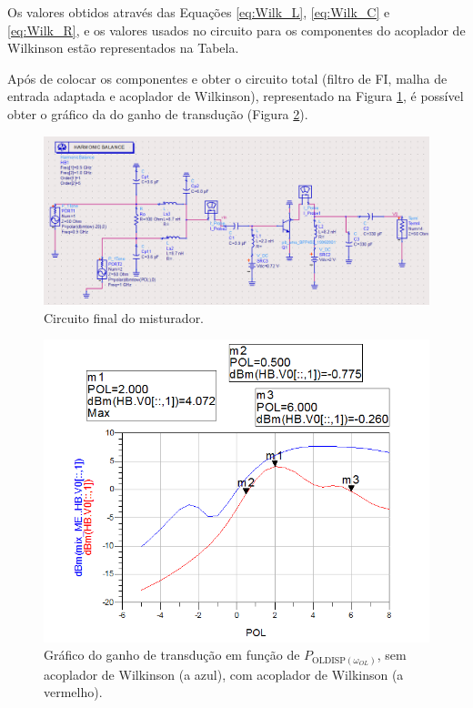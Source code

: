 \documentclass[11pt]{article}
\numberwithin{equation}{section}
\begin{document}
Os valores obtidos através das Equações \ref{eq:Wilk_L}, \ref{eq:Wilk_C} e \ref{eq:Wilk_R}, e os valores usados no circuito para os componentes do acoplador de Wilkinson estão representados na Tabela.


Após de colocar os componentes e obter o circuito total (filtro de FI, malha de entrada adaptada e acoplador de Wilkinson), representado na Figura \ref{fig:Circuito_3}, é possível obter o gráfico da do ganho de transdução (Figura \ref{fig:GT_3}).



\begin{figure}[h]
\centering
\includegraphics[keepaspectratio=true, scale=0.45]{exps/Circuito_3}
\vspace{-0.5em}
\caption{Circuito final do misturador.}
\vspace{-0.8em}
\label{fig:Circuito_3}
\end{figure}



\begin{figure}[h]
\centering
\includegraphics[keepaspectratio=true, scale=0.45]{exps/GT_3}
\vspace{-0.5em}
\caption{Gráfico do ganho de transdução em função de $ P_{\text{OLDISP}\left(\omega_{OL}\right)} $, sem acoplador de Wilkinson (a azul), com acoplador de Wilkinson (a vermelho).}
\vspace{-0.8em}
\label{fig:GT_3}
\end{figure}
\end{document}

